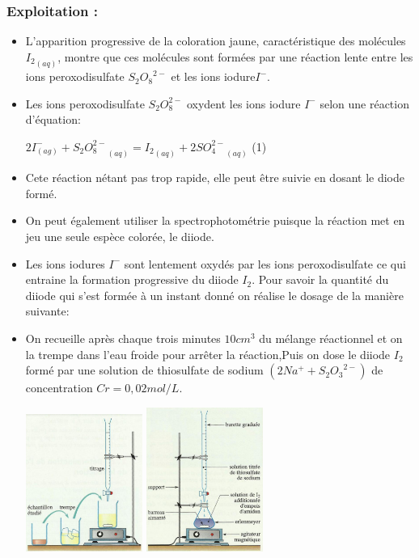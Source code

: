 \documentclass[12pt]{article}
\begin{document}
\subsubsection{Exploitation :}
\begin{itemize}
	\item L'apparition progressive de la coloration jaune, caractéristique des molécules ${I_2}_{(aq)}$, montre que ces molécules sont formées par une réaction lente entre les ions peroxodisulfate ${S_2O_8}^{2-}$ et les ions iodure$I^-$. 

\item Les ions peroxodisulfate $S_2O_8^{2-}$ oxydent les ions iodure $I^-$ selon une réaction d'équation: 

	$2I^-_{(ag)} + {S_2O_8^{2-}}_{(aq)} = {I_2}_{(aq)} + 2{SO_4^{2-}}_{(aq)}$ (1)

	\item Cete réaction nétant pas trop rapide, elle peut être suivie en dosant le
diode formé.

\item On peut également utiliser la spectrophotométrie puisque la réaction met en jeu une seule espèce colorée, le diiode.

\item Les ions iodures $I^-$ sont lentement oxydés par les ions peroxodisulfate ce qui entraine la formation progressive du diiode $I_2$.
Pour savoir la quantité du diiode qui s'est formée à un instant donné on réalise le dosage de la manière suivante:

\item On recueille après chaque trois minutes $10cm^3$ du mélange réactionnel et on la trempe dans l'eau froide pour arrêter la réaction,Puis on dose le diiode $I_2$ formé par une solution de thiosulfate de sodium $(2Na^+ + {S_2O_3}^{2-})$  de concentration $Cr= 0,02mol/L$.


	\begin{center}
	\includegraphics[width=0.3\textwidth]{./img/STlatrempe.png}
	\includegraphics[width=0.3\textwidth]{./img/STmotageDosage.png}
\end{center}


\end{itemize}
\end{document}
